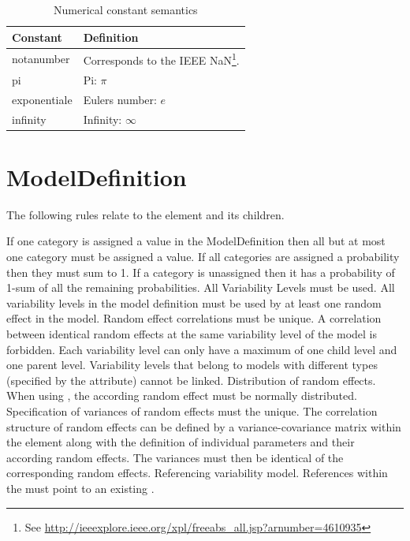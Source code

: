 \begin{table}[ht!]
\begin{center}
\small
\begin{tabular}{ll}\toprule
Constant & Definition \\ \midrule
notanumber & Corresponds to the IEEE NaN\footnote{See
  \url{http://ieeexplore.ieee.org/xpl/freeabs_all.jsp?arnumber=4610935}}.\\
pi & Pi: $\pi$\\
exponentiale & Eulers number: $e$\\
infinity & Infinity: $\infty$\\\bottomrule
\end{tabular}
\end{center}
\caption{Numerical constant semantics}
\label{tab:numerical-const-semantics}
\end{table}%


\section{ModelDefinition}

The following rules relate to the  element and
its children.

\begin{valrules}
If one category is assigned a value in the ModelDefinition then all
but at most one category must be assigned a
value.
If all categories are assigned a probability then they must sum to 1. If a category is 
unassigned then it has a probability of 1-sum of all the remaining probabilities. 
 {All Variability Levels must be used.} All variability
levels in the model definition must be used by at least one random
effect in the model.
 {Random effect correlations must be unique.} A
correlation between identical random effects at the same variability
level of the model is forbidden.
 Each variability level can only have a maximum of one child
level and one parent level. Variability levels that belong to models
with different types (specified by the  attribute) cannot
be linked.
 {Distribution of random effects.} When using , 
the according random effect must be normally distributed.
 {Specification of variances of random effects must the unique.} 
The correlation structure of random effects can be defined by a variance-covariance 
matrix within the  element along with the definition of individual
parameters and their according random effects.
The variances must then be identical of the corresponding random effects.
 {Referencing variability model.} References within the 
 must point to an existing .
\end{valrules}

